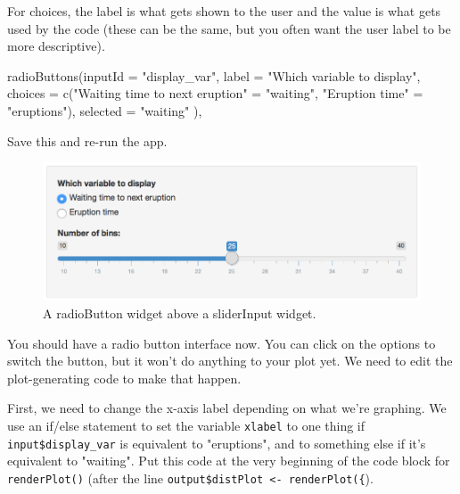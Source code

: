 \documentclass[
  oneside]{book}
\newenvironment{Shaded}{\begin{snugshade}}{\end{snugshade}}
\newcommand{\AttributeTok}[1]{\textcolor[rgb]{0.77,0.63,0.00}{#1}}
\newcommand{\FunctionTok}[1]{\textcolor[rgb]{0.00,0.00,0.00}{#1}}
\newcommand{\NormalTok}[1]{#1}
\newcommand{\OtherTok}[1]{\textcolor[rgb]{0.56,0.35,0.01}{#1}}
\newcommand{\StringTok}[1]{\textcolor[rgb]{0.31,0.60,0.02}{#1}}
\begin{document}
For \AttributeTok{choices}, the label is what gets shown to the user and the value is what gets used by the code (these can be the same, but you often want the user label to be more descriptive).

\begin{Shaded}
\begin{Highlighting}[]
         \FunctionTok{radioButtons}\NormalTok{(}\AttributeTok{inputId =} \StringTok{"display\_var"}\NormalTok{,}
                      \AttributeTok{label =} \StringTok{"Which variable to display"}\NormalTok{,}
                      \AttributeTok{choices =} \FunctionTok{c}\NormalTok{(}\StringTok{"Waiting time to next eruption"} \OtherTok{=} \StringTok{"waiting"}\NormalTok{,}
                                  \StringTok{"Eruption time"} \OtherTok{=} \StringTok{"eruptions"}\NormalTok{),}
                      \AttributeTok{selected =} \StringTok{"waiting"}
\NormalTok{         ),}
\end{Highlighting}
\end{Shaded}

Save this and re-run the app.

\begin{figure}

{\centering \includegraphics[width=1\linewidth]{images/demo_app/08-radiobutton-widget} 

}

\caption{A radioButton widget above a sliderInput widget.}\label{fig:first-radiobutton-widget}
\end{figure}

You should have a radio button interface now. You can click on the options to switch the button, but it won't do anything to your plot yet. We need to edit the plot-generating code to make that happen.

First, we need to change the x-axis label depending on what we're graphing. We use an if/else statement to set the variable \texttt{xlabel} to one thing if \texttt{input\$display\_var} is equivalent to \StringTok{"eruptions"}, and to something else if it's equivalent to \StringTok{"waiting"}. Put this code at the very beginning of the code block for \texttt{renderPlot}\texttt{()} (after the line \texttt{output\$distPlot\ \textless{}-\ renderPlot(\{}).
\end{document}
